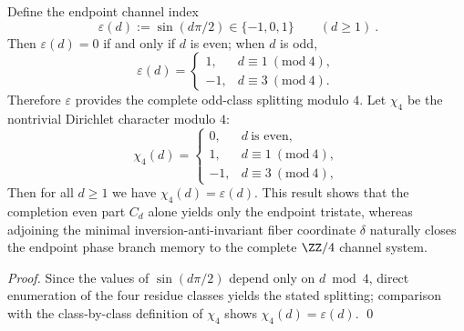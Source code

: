 \begin{theorem}\label{thm:endpoint-four-channel-chi4}
Define the endpoint channel index
\begin{equation}\label{eq:endpoint-epsilon-def}
\boxed{\ \varepsilon(d):=\sin(d\pi/2)\in\{-1,0,1\}\qquad(d\ge 1)\ }.
\end{equation}
Then \(\varepsilon(d)=0\) if and only if \(d\) is even; when \(d\) is odd,
\[
\varepsilon(d)=
\begin{cases}
1, & d\equiv 1\ (\mathrm{mod}\ 4),\\
-1,& d\equiv 3\ (\mathrm{mod}\ 4).
\end{cases}
\]
Therefore \(\varepsilon\) provides the complete odd-class splitting modulo \(4\).
Let \(\chi_{4}\) be the nontrivial Dirichlet character modulo \(4\):
\[
\boxed{\;
\chi_{4}(d)=
\begin{cases}
0, & d\ \text{is even},\\
1, & d\equiv 1\ (\mathrm{mod}\ 4),\\
-1,& d\equiv 3\ (\mathrm{mod}\ 4),
\end{cases}\;}
\]
Then for all \(d\ge 1\) we have \(\chi_{4}(d)=\varepsilon(d)\).
This result shows that the completion even part \(C_d\) alone yields only the endpoint tristate, whereas adjoining the minimal inversion-anti-invariant fiber coordinate \(\delta\) naturally closes the endpoint phase branch memory to the complete \(\ZZ/4\) channel system.
\end{theorem}
\begin{proof}
Since the values of \(\sin(d\pi/2)\) depend only on \(d\bmod 4\), direct enumeration of the four residue classes yields the stated splitting; comparison with the class-by-class definition of \(\chi_4\) shows \(\chi_4(d)=\varepsilon(d)\). \qed
\end{proof}

